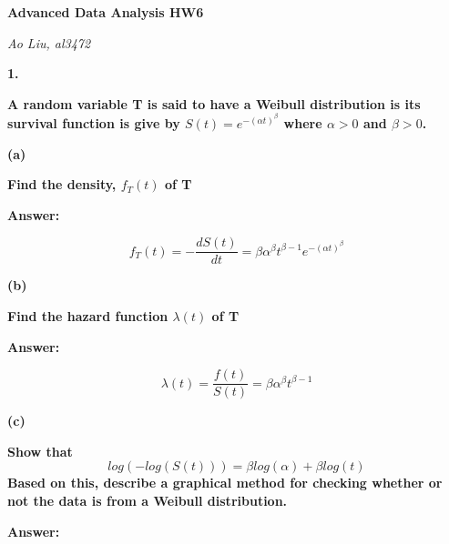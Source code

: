 \documentclass[letterpaper,11pt]{article}
\begin{document}
\begin{center}
	\textbf{\Huge{Advanced Data Analysis HW6}}
\end{center}

\begin{center}
	\textsl{Ao Liu, al3472}
\end{center}

\bigbreak
\bigbreak
\bigbreak



\begin{addmargin}[-2em]{0em}
  \large{\textbf{1. }}
\end{addmargin}
\textbf{A random variable T is said to have a Weibull distribution is its survival function is give by $S(t) = e^{-(\alpha t)^\beta}$ where $\alpha > 0$ and $\beta > 0$.}

\begin{addmargin}[-1.1em]{0em}
  \textbf{(a)}\par
\end{addmargin}
\textbf{Find the density, $f_T (t)$ of T}\par
\bigbreak
\begin{addmargin}[-0.5em]{0em}
  \textbf{Answer: }
\end{addmargin}

$$f_T(t) = -\frac{dS(t)}{dt} = \beta\alpha^{\beta}t^{\beta-1}e^{-(\alpha t)^{\beta}}$$



\begin{addmargin}[-1.1em]{0em}
  \textbf{(b)}\par
\end{addmargin}
\textbf{Find the hazard function $\lambda(t)$ of T}\par
\bigbreak
\begin{addmargin}[-0.5em]{0em}
  \textbf{Answer: }
\end{addmargin}

$$\lambda(t) = \frac{f(t)}{S(t)} = \beta\alpha^{\beta}t^{\beta-1}$$


\begin{addmargin}[-1.1em]{0em}
  \textbf{(c)}\par
\end{addmargin}
\textbf{Show that}
$$log(-log(S(t))) = \beta log(\alpha) + \beta log(t)$$
\textbf{Based on this, describe a graphical method for checking whether or not the data is
from a Weibull distribution.}\par
\bigbreak
\begin{addmargin}[-0.5em]{0em}
  \textbf{Answer: }
\end{addmargin}
\end{document}
